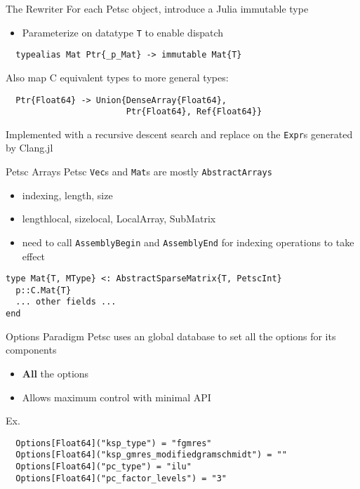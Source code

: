 \documentclass{beamer}
\begin{document}
\begin{frame}[fragile]{The Rewriter}
For each Petsc object, introduce a Julia immutable type
\begin{itemize}
  \item Parameterize on datatype \texttt{T} to enable dispatch
\end{itemize}
\begin{verbatim}
  typealias Mat Ptr{_p_Mat} -> immutable Mat{T}
\end{verbatim}
\hfill

Also map C equivalent types to more general types:
\begin{verbatim} 
  Ptr{Float64} -> Union{DenseArray{Float64},
                        Ptr{Float64}, Ref{Float64}}
\end{verbatim}
\hfill

Implemented with a recursive descent search and replace on the \texttt{Expr}s 
generated by Clang.jl

\end{frame}

\begin{frame}[fragile]{Petsc Arrays}
Petsc \texttt{Vec}s and \texttt{Mat}s are mostly \texttt{AbstractArrays}
\begin{itemize}
  \item indexing, length, size
  \item lengthlocal, sizelocal, LocalArray, SubMatrix
  \item need to call \texttt{AssemblyBegin} and \texttt{AssemblyEnd} for indexing operations to take effect
\end{itemize}

\begin{verbatim}
type Mat{T, MType} <: AbstractSparseMatrix{T, PetscInt}
  p::C.Mat{T}
  ... other fields ...
end
\end{verbatim}




\end{frame}

\begin{frame}[fragile]{Options Paradigm}
Petsc uses an global database to set all the options for its components
\begin{itemize}
  \item \textbf{All} the options
  \item Allows maximum control with minimal API
\end{itemize}
\hfill

Ex.
\begin{verbatim}
  Options[Float64]("ksp_type") = "fgmres"
  Options[Float64]("ksp_gmres_modifiedgramschmidt") = ""
  Options[Float64]("pc_type") = "ilu"
  Options[Float64]("pc_factor_levels") = "3"
\end{verbatim}

\end{frame}
\end{document}
